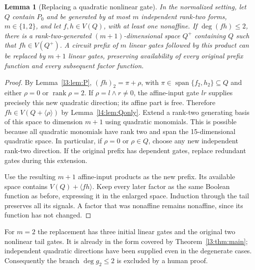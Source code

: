 \documentclass[11pt,a4paper]{article}
\theoremstyle{plain}
\newtheorem{lemma}[theorem]{Lemma}
\theoremstyle{remark}
\newcommand{\Span}{\operatorname{span}}
\newcommand{\rk}{\operatorname{rank}}
\begin{document}
\begin{lemma}[Replacing a quadratic nonlinear gate]\label{l2:lem:replace}
In the normalized setting, let $Q$ contain $P_0$ and be generated by at most $m$ independent rank-two forms, $m\in\{1,2\}$, and let $f,h\in V(Q)$, with at least one nonaffine. If $\deg(fh)\le2$, there is a rank-two-generated $(m+1)$-dimensional space $Q^+$ containing $Q$ such that $fh\in V(Q^+)$. A circuit prefix of $m$ linear gates followed by this product can be replaced by $m+1$ linear gates, preserving availability of every original prefix function and every subsequent factor function.
\end{lemma}
\begin{proof}
By Lemma~\ref{l3:lem:P}, $(fh)_2=\pi+\rho$, with $\pi\in\Span\{f_2,h_2\}\subseteq Q$ and either $\rho=0$ or $\rk\rho=2$. If $\rho=l\wedge r\ne0$, the affine-input gate $lr$ supplies precisely this new quadratic direction; its affine part is free. Therefore $fh\in V(Q+\langle\rho\rangle)$ by Lemma~\ref{l4:lem:Qonly}. Extend a rank-two generating basis of this space to dimension $m+1$ using quadratic monomials. This is possible because all quadratic monomials have rank two and span the 15-dimensional quadratic space. In particular, if $\rho=0$ or $\rho\in Q$, choose any new independent rank-two direction. If the original prefix has dependent gates, replace redundant gates during this extension.

Use the resulting $m+1$ affine-input products as the new prefix. Its available space contains $V(Q)+\langle fh\rangle$. Keep every later factor as the same Boolean function as before, expressing it in the enlarged space. Induction through the tail preserves all its signals. A factor that was nonaffine remains nonaffine, since its function has not changed.
\end{proof}
For $m=2$ the replacement has three initial linear gates and the original two nonlinear tail gates. It is already in the form covered by Theorem~\ref{l3:thm:main}; independent quadratic directions have been supplied even in the degenerate cases. Consequently the branch $\deg g_2\le2$ is excluded by a human proof.
\end{document}
